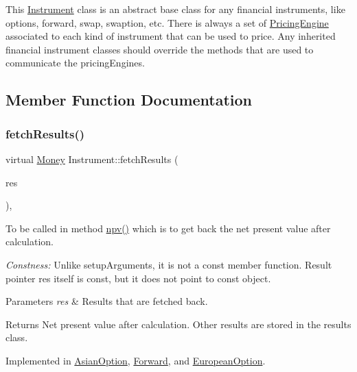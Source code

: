 This \hyperlink{class_instrument}{Instrument} class is an abstract base class for any financial instruments, like options, forward, swap, swaption, etc. There is always a set of \hyperlink{class_pricing_engine}{Pricing\+Engine} associated to each kind of instrument that can be used to price. Any inherited financial instrument classes should override the methods that are used to communicate the pricing\+Engines. 

\subsection{Member Function Documentation}
\hypertarget{class_instrument_a381f093402f789ad7c0ffecd233167dc}{}\label{class_instrument_a381f093402f789ad7c0ffecd233167dc} 
\subsubsection{\texorpdfstring{fetch\+Results()}{fetchResults()}}
{\footnotesize\ttfamily virtual \hyperlink{_name_def_8h_a5a9d48c16a694e9a2d9f1eca730dc8c5}{Money} Instrument\+::fetch\+Results (\begin{DoxyParamCaption}\item[{\hyperlink{class_pricing_engine_1_1_results}{Pricing\+Engine\+::\+Results} $\ast$const}]{res }\end{DoxyParamCaption})\hspace{0.3cm}{\ttfamily [protected]}, {}}



To be called in method \hyperlink{class_instrument_aa750f2ae95a21d65a073da3171e8d084}{npv()} which is to get back the net present value after calculation. 

{\itshape Constness\+:} Unlike setup\+Arguments, it is not a const member function. Result pointer res itself is const, but it does not point to const object. 
\begin{DoxyParams}{Parameters}
{\em res} & Results that are fetched back. \\
\hline
\end{DoxyParams}
\begin{DoxyReturn}{Returns}
Net present value after calculation. Other results are stored in the results class. 
\end{DoxyReturn}


Implemented in \hyperlink{class_asian_option_a99cd9956b73d99a64748c913dcccd6ea}{Asian\+Option}, \hyperlink{class_forward_ab1e2edeb8345c8605013634a598d1ae5}{Forward}, and \hyperlink{class_european_option_ae234d562ef21dc24c25f1538860da1cf}{European\+Option}.

